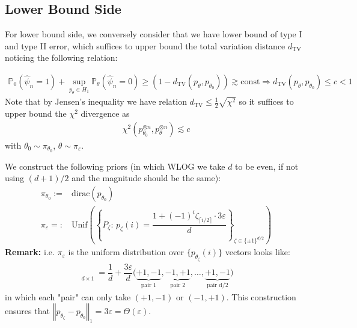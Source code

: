 \documentclass[twoside,12pt]{article}
\begin{document}
\subsection{Lower Bound Side}

For lower bound side, we conversely consider that we have lower bound of type I and type II error, which suffices to upper bound the total variation distance $ d_{\mathrm{ TV }}  $ noticing the following relation:

\begin{align*}
      \mathbb{P}_0\left( \hat{\psi}_n=1 \right) + \mathop{ \sup }\limits_{p_\theta \in H_1} \mathbb{P}_\theta \left( \hat{\psi}_n = 0 \right) \geq (1-d_{\mathrm{ TV }}(p_\theta ,p_{\theta _0})) \gtrsim \mathrm{const} \Rightarrow d_{\mathrm{ TV }}(p_\theta ,p_{\theta _0}) \leq c < 1
\end{align*}
Note that by Jensen's inequality we have relation $ d_\mathrm{ TV } \leq \frac{1}{2}\sqrt{\chi^2} $ so it suffices to upper bound the $ \chi^2 $ divergence as
\begin{align*}
   \chi^2(p_{\theta _0}^{\otimes n},p_\theta ^{\otimes n}) \lesssim c
\end{align*}
with $ \theta _0\sim \pi_{\theta _0} $, $ \theta \sim \pi_\varepsilon  $.

We construct the following priors (in which WLOG we take $ d $ to be even, if not using $ (d+1)/2 $ and the magnitude should be the same):
\begin{align*}
   \pi_{\theta _0}:=& \mathrm{ dirac }(p_{\theta _0})\\
   \pi_{\varepsilon  }=:& \mathrm{ Unif }(\left\{P_\zeta :\, p_\zeta (i) = \dfrac{ 1 + (-1)^i\zeta _{\lceil i/2 \rceil}\cdot 3\varepsilon  }{ d } \right\}_{\zeta \in \{\pm 1\}^{d/2}} ) 
\end{align*}
\textbf{Remark:} i.e. $ \pi_\varepsilon  $ is the uniform distribution over $ \{p_{\theta_\zeta } (i)\} $ vectors looks like:
\begin{align*}
   \mathop{ p_{\theta _\zeta } }\limits_{d\times 1} =\dfrac{ 1 }{ d } + \dfrac{ 3\varepsilon  }{ d }  \big( \underbrace{+1,-1}_{\text{pair 1}},     \underbrace{-1,+1}_{\text{pair 2}},\ldots, \underbrace{+1,-1}_{\text{pair d/2}} \big) 
\end{align*}
in which each "pair" can only take $ (+1,-1) $ or $ (-1,+1) $. This construction ensures that $ \left\Vert p_{\theta _\zeta }-p_{\theta _0} \right\Vert _1 = 3\varepsilon  = \Theta (\varepsilon  ) $.

 
\end{document}
